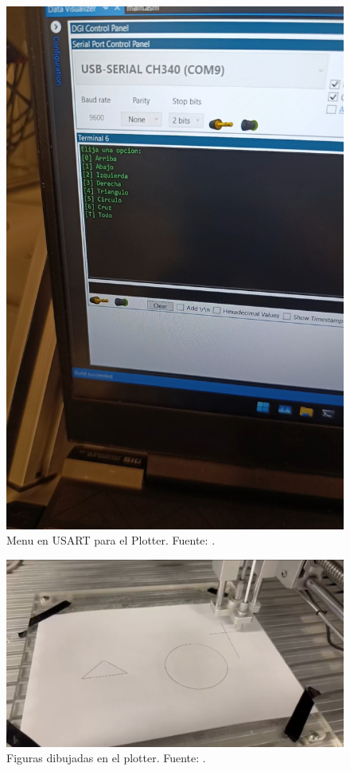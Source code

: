 \begin{figure}[H]
  \centering
  \includegraphics[width=0.7\linewidth]{./Anexos/Resultados/Plotter/Menu.jpg}
  \caption{Menu en USART para el Plotter. Fuente: \cite{LabDrive}.}
  \label{fig:plotter_menu}
\end{figure}

\begin{figure}[H]
  \centering
  \includegraphics[width=\linewidth]{./Anexos/Resultados/Plotter/Dibujos.jpg}
  \caption{Figuras dibujadas en el plotter. Fuente: \cite{LabDrive}.}
  \label{fig:plotter_figuras}
\end{figure}